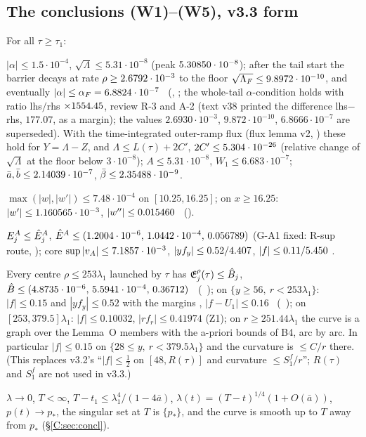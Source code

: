 \documentclass[11pt]{article}
\begin{document}
\subsection{The conclusions (W1)--(W5), v3.3 form}\label{C:sec:W}
For all $\tau\ge\tau_1$:
\begin{description}[leftmargin=1.2em]
\item[(W1) trapping] $|\alpha|\le1.5\cdot10^{-4}$, $\sqrt\Lambda\le5.31\cdot10^{-8}$ (peak $5.30850\cdot10^{-8}$); after the tail start the barrier decays at rate $\rho\ge2.6792\cdot10^{-3}$ to the floor $\sqrt{\Lambda_F}\le9.8972\cdot10^{-10}$, and eventually $|\alpha|\le\alpha_F=6.8824\cdot10^{-7}$ \tC\ (\SV, ; the whole-tail $\alpha$-condition holds with ratio lhs$/$rhs $\times1554.45$, review R-3 and A-2 (text v38 printed the difference lhs$-$rhs, $177.07$, as a margin); the  values $2.6930\cdot10^{-3}$, $9.872\cdot10^{-10}$, $6.8666\cdot10^{-7}$ are superseded). With the time-integrated outer-ramp flux (flux lemma v2, ) these hold for $Y=\Lambda-Z$, and $\Lambda\le L(\tau)+2C'$, $2C'\le5.304\cdot10^{-26}$ (relative change of $\sqrt\Lambda$ at the floor below $3\cdot10^{-8}$); $A\le5.31\cdot10^{-8}$, $W_1\le6.683\cdot10^{-7}$; $\bar a,\bar b\le2.14039\cdot10^{-7}$, $\bar\beta\le2.35488\cdot10^{-9}$.
\item[(W2) tip] $\max(|w|,|w'|)\le7.48\cdot10^{-4}$ on $[10.25,16.25]$; on $x\ge16.25$: $|w'|\le1.160565\cdot10^{-3}$, $|w''|\le0.015460$ \tC\ (\SV).
\item[(W3) shells] $E^A_j\le\hat E^A_j$, $\hat E^A\le(1.2004\cdot10^{-6},\,1.0442\cdot10^{-4},\,0.056789)$ (G-A1 fixed: R-sup route, ); core $\sup|v_A|\le7.1857\cdot10^{-3}$, $|yf_y|\le0.52/4.407$, $|f|\le0.11/5.450$ \tC\tB.
\item[(W4) far field] Every centre $\rho\le253\lambda_1$ launched by $\tau$ has $\mathfrak E^\rho_j(\tau)\le\hat B_j$, $\hat B\le(4.8735\cdot10^{-6},\,5.5941\cdot10^{-4},\,0.36712)$ \tC\ (\SU\ ); on $\{y\ge56,\ r<253\lambda_1\}$: $|f|\le0.15$ and $|yf_y|\le0.52$ with the margins \UmarV, $|f-U_1|\le0.16$ \tC\ (\SU\ ); on $[253,379.5]\lambda_1$: $|f|\le0.10032$, $|rf_r|\le0.41974$ (Z1); on $r\ge251.44\lambda_1$ the curve is a graph over the Lemma~O members with the a-priori bounds of B4, arc by arc. In particular $|f|\le0.15$ on $\{28\le y,\ r<379.5\lambda_1\}$ and the curvature is $\le C/r$ there. (This replaces v3.2's ``$|f|\le\frac12$ on $[48,R(\tau)]$ and curvature $\le S_1^f/r$''; $R(\tau)$ and $S_1^f$ are not used in v3.3.)
\item[(W5) consequences] $\lambda\to0$, $T<\infty$, $T-t_1\le\lambda_1^4/(1-4\bar a)$, $\lambda(t)=(T-t)^{1/4}(1+O(\bar a))$, $p(t)\to p_*$, the singular set at $T$ is $\{p_*\}$, and the curve is smooth up to $T$ away from $p_*$ (\S\ref{C:sec:concl}).
\end{description}
\end{document}
